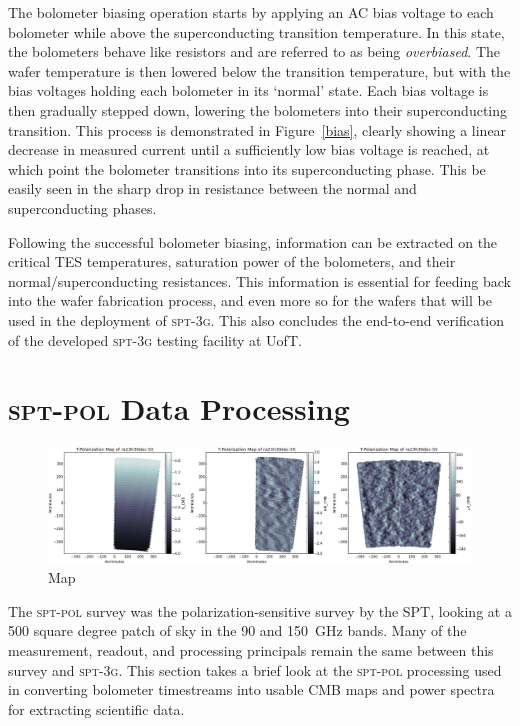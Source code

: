 \documentclass[iop]{emulateapj}
\begin{document}
The bolometer biasing operation starts by applying an AC bias voltage to each bolometer while above the superconducting transition temperature.  In this state, the bolometers behave like resistors and are referred to as being \textit{overbiased}.  The wafer temperature is then lowered below the transition temperature, but with the bias voltages holding each bolometer in its `normal' state.  Each bias voltage is then gradually stepped down, lowering the bolometers into their superconducting transition.  This process is demonstrated in Figure~\ref{bias}, clearly showing a linear decrease in measured current until a sufficiently low bias voltage is reached, at which point the bolometer transitions into its superconducting phase.  This be easily seen in the sharp drop in resistance between the normal and superconducting phases.

Following the successful bolometer biasing, information can be extracted on the critical TES temperatures, saturation power of the bolometers, and their normal/superconducting resistances.  This information is essential for feeding back into the wafer fabrication process, and even more so for the wafers that will be used in the deployment of \textsc{spt-3g}.  This also concludes the end-to-end verification of the developed \textsc{spt-3g} testing facility at UofT.

\section{\textsc{spt-pol} Data Processing}
\label{data_section}

\begin{figure}
	\includegraphics[width=\textwidth]{map_filtering}
	\centering
	\caption{Map}
	\label{map}
\end{figure}

The \textsc{spt-pol} survey was the polarization-sensitive survey by the SPT, looking at a 500 square degree patch of sky in the 90 and 150~GHz bands.  Many of the measurement, readout, and processing principals remain the same between this survey and \textsc{spt-3g}.  This section takes a brief look at the \textsc{spt-pol} processing used in converting bolometer timestreams into usable CMB maps and power spectra for extracting scientific data.
\end{document}

